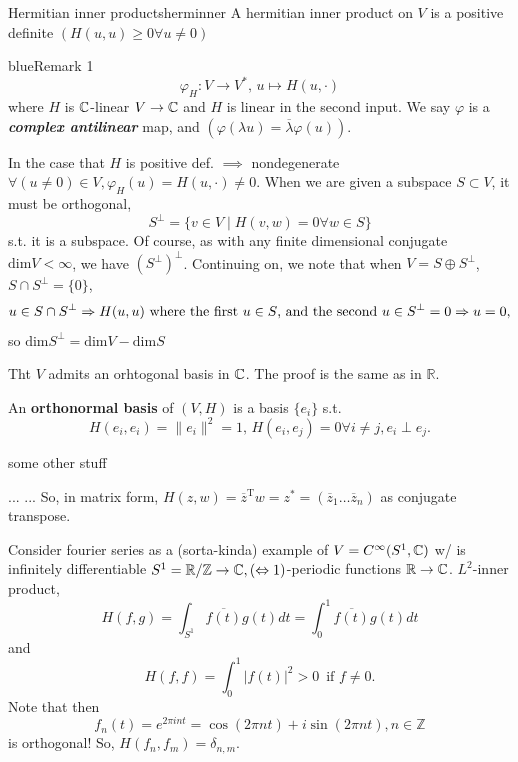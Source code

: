 \documentclass[12pt,oneside]{report}
\begin{document}
\begin{definition}{Hermitian inner products}{herminner}
  A hermitian inner product on \( V \) is a positive definite  \(  (H(u,u)\ge 0 \forall u \neq 0) \)
\end{definition}

\begin{mybox}{blue}{Remark 1}
  \[
    \varphi _H : V \to  V^*, \, u \mapsto H(u,\cdot )
  \]
  where \( H \) is \( \CC \)-linear \( V \to  \CC \) and \( H \) is linear in the second input. We say \( \varphi  \) is a \textbf{\textit{complex antilinear}} map, and \( (\varphi (\lambda  u ) = \overline{\lambda } \varphi (u) ) \).
\end{mybox}

In the case that \( H \) is positive def. \( \implies \) nondegenerate \( \forall (u \neq 0)\in  V , \varphi _H(u)=H (u,\cdot )\neq 0\). When we are given a subspace \( S \subset  V \), it must be orthogonal, 
\[ S^\perp = \{v \in  V \mid H(v,w)=0 \forall w \in  S\}   \]
s.t. it is a subspace. Of course, as with any finite dimensional conjugate \( \text{dim}V<\infty \), we have \( (S^{\perp})^\perp \). Continuing on, we note that when \( V = S \oplus S^\perp \), \(S \cap S^\perp = \{0\} \), \[
  u \in  S \cap S^\perp \implies H(u,u) \text{ where the first \( u \in  S\), and the second \( u \in  S^\perp \)} =0 \implies u=0,
\] 
so \( \text{dim}S^\perp = \text{dim} V - \text{dim}S \)

\begin{theorem}{Th}{t}
  \( V \) admits an orhtogonal basis in \( \CC\). The proof is the same as in \( \mathbb{R} \). 
\end{theorem}

\begin{definition}{}{}
  An \textbf{orthonormal basis} of \( (V,H) \) is a basis \( \{e_i\}   \) s.t. 
  \begin{displaymath}
    H(e_i,e_i)=\|e_i\|^2 =1, \, H(e_i,e_j)=0 \forall i\neq j, e_i \perp e_j. 
  \end{displaymath}
  
\end{definition}

some other stuff


...
...
So, in matrix form, \( H(z,w)=\overline{z}^{\text{T}}w =z^*=(\overline{z}_{1}\ldots \overline{z}_n) \) as conjugate transpose. 

Consider fourier series as a (sorta-kinda) example of \( V=C^{\infty} (S^1,\CC) \) w/ is infinitely differentiable \( S^1=\mathbb{R}/\mathbb{Z} \to  \CC, (\iff 1)\)-periodic functions \( \mathbb{R} \to  \CC \). \( L^2 \)-inner product, \[
  H(f,g)=\int_{S^1}\overline{f(t)} g(t)dt = \int_0^1 \overline{f(t)} g(t)dt\]
  and 
  \[
    H(f,f) = \int _0^1|f(t)|^2 > 0\,  \text{ if } f\neq 0
  .\] 
  Note that then \[ f_n(t) =e^{2 \pi  i nt} = \cos (2 \pi  nt) + i \sin  (2 \pi  nt), n \in  \mathbb{Z}\] is orthogonal! So, \( H(f_n,f_m)=\delta _{n,m}  \). 
\end{document}

